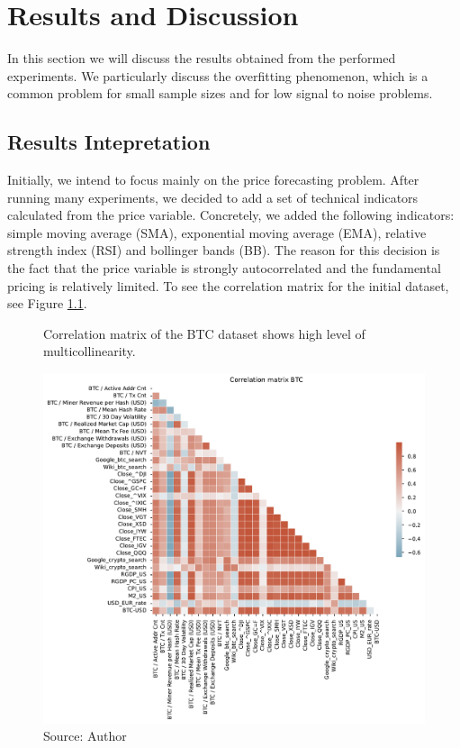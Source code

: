 \chapter{Results and Discussion}
\label{chap:five}
In this section we will discuss the results obtained from 
the performed experiments. We particularly discuss the 
overfitting phenomenon, which is a common problem
for small sample sizes and for low signal to noise problems. 


\section{Results Intepretation}
\label{sec:results}
Initially, we intend to focus mainly on the price forecasting problem.
After running many experiments, we decided to add 
a set of technical indicators calculated from the price variable.
Concretely, we added the following indicators: simple moving average (SMA),
exponential moving average (EMA), relative strength index (RSI) and 
bollinger bands (BB). The reason for this decision is the fact
that the price variable is strongly autocorrelated and 
the fundamental pricing is relatively limited. 
To see the correlation matrix for the initial
dataset, see Figure \ref{fig:Corr_btc}.

\begin{figure}[!h]
    \centering
    \caption{Correlation matrix of the BTC dataset shows high level of 
    multicollinearity.}
    \includegraphics[width=1\textwidth]{Figures/Corr_btc.pdf}
    \caption*{Source: Author}
    \label{fig:Corr_btc}
\end{figure}

